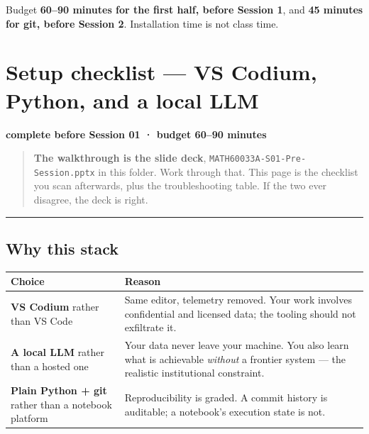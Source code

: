 \documentclass[
  letterpaper,
  10pt,
  twoside,
  openright,
  numbers=noenddot,
  chapterprefix=true]{scrbook}
\begin{document}
\begin{qmibwarn}

Budget \textbf{60--90 minutes for the first half, before Session 1}, and
\textbf{45 minutes for git, before Session 2}. Installation time is not
class time.

\end{qmibwarn}

\section{Setup checklist --- VS Codium, Python, and a local
LLM}\label{vs-codium-python-and-a-local-model}

\textbf{complete before Session 01 · budget 60--90 minutes}

\begin{quote}
\textbf{The walkthrough is the slide deck},
\texttt{MATH60033A-S01-Pre-Session.pptx} in this folder. Work through
that. This page is the checklist you scan afterwards, plus the
troubleshooting table. If the two ever disagree, the deck is right.
\end{quote}

\begin{center}\rule{0.5\linewidth}{0.5pt}\end{center}

\subsection{Why this stack}\label{why-this-stack}

\begin{longtable}[]{@{}
  >{\raggedright\arraybackslash}p{}
  >{\raggedright\arraybackslash}p{}@{}}
\toprule\noalign{}
\begin{minipage}[b]{\linewidth}\raggedright
Choice
\end{minipage} & \begin{minipage}[b]{\linewidth}\raggedright
Reason
\end{minipage} \\
\midrule\noalign{}
\endhead
\bottomrule\noalign{}
\endlastfoot
\textbf{VS Codium} rather than VS Code & Same editor, telemetry removed.
Your work involves confidential and licensed data; the tooling should
not exfiltrate it. \\
\textbf{A local LLM} rather than a hosted one & Your data never leave
your machine. You also learn what is achievable \emph{without} a
frontier system --- the realistic institutional constraint. \\
\textbf{Plain Python + git} rather than a notebook platform &
Reproducibility is graded. A commit history is auditable; a notebook's
execution state is not. \\
\end{longtable}
\end{document}
